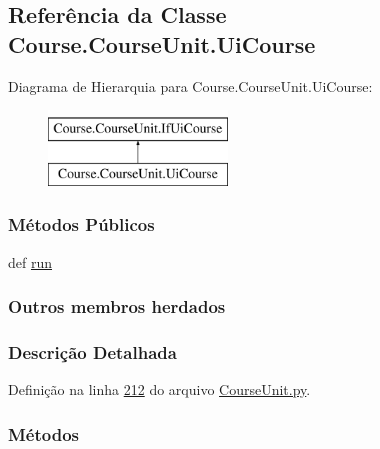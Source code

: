 \hypertarget{classCourse_1_1CourseUnit_1_1UiCourse}{}\subsection{Referência da Classe Course.\+Course\+Unit.\+Ui\+Course}
\label{classCourse_1_1CourseUnit_1_1UiCourse}
Diagrama de Hierarquia para Course.\+Course\+Unit.\+Ui\+Course\+:\begin{figure}[H]
\begin{center}
\leavevmode
\includegraphics[height=2.000000cm]{d1/dbb/classCourse_1_1CourseUnit_1_1UiCourse}
\end{center}
\end{figure}
\subsubsection*{Métodos Públicos}
\begin{DoxyCompactItemize}
\item 
def \hyperlink{classCourse_1_1CourseUnit_1_1UiCourse_aaaf2b8229f2b774f12e719bc0e6f13cb}{run}
\end{DoxyCompactItemize}
\subsubsection*{Outros membros herdados}


\subsubsection{Descrição Detalhada}


Definição na linha \hyperlink{CourseUnit_8py_source_l00212}{212} do arquivo \hyperlink{CourseUnit_8py_source}{Course\+Unit.\+py}.



\subsubsection{Métodos}
\hypertarget{classCourse_1_1CourseUnit_1_1UiCourse_aaaf2b8229f2b774f12e719bc0e6f13cb}{}
